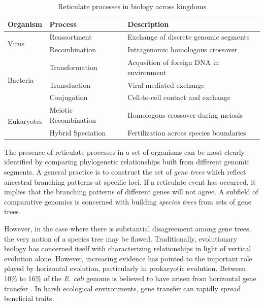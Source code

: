 \begin{table}
\centering
\caption[Reticulate processes in biology across kingdoms]{Reticulate processes in biology across kingdoms}
\begin{tabularx}{\textwidth}{lll}
\toprule
Organism & Process & Description \\
\midrule
\multirow{2}{*}{Virus} & Reassortment & Exchange of discrete genomic segments \\
                       & Recombination & Intragenomic homologous crossover \\
\midrule
\multirow{3}{*}{Bacteria} & Transformation & Acqusition of foreign DNA in environment \\
                          & Transduction   & Viral-mediated exchange \\
                          & Conjugation    & Cell-to-cell contact and exchange \\
\midrule
\multirow{2}{*}{Eukaryotes} & Meiotic Recombination & Homologous crossover during meiosis \\
                            & Hybrid Speciation         & Fertilization across species boundaries \\
\bottomrule
\end{tabularx}
\label{table:reticulation_processes}
\end{table}

The presence of reticulate processes in a set of organisms can be most clearly identified by comparing phylogenetic relationships built from different genomic segments.
A general practice is to construct the set of \emph{gene trees} which reflect ancestral branching patterns at specific loci.
If a reticulate event has occurred, it implies that the branching patterns of different genes will not agree.
A subfield of comparative genomics is concerned with building \emph{species trees} from sets of gene trees.

However, in the case where there is substantial disagreement among gene trees, the very notion of a species tree may be flawed.
Traditionally, evolutionary biology has concerned itself with characterizing relationships in light of vertical evolution alone.
However, increasing evidence  has pointed to the important role played by horizontal evolution, particularly in prokaryotic evolution.
Between 10\% to 16\% of the \emph{E. coli} genome is believed to have arisen from horizontal gene transfer \cite{Ochman:2000dr}.
In harsh ecological environments, gene transfer can rapidly spread beneficial traits.

